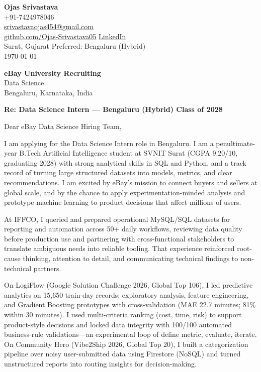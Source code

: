 \documentclass[a4paper,11pt]{article}
\begin{document}
\begin{flushright}
\textbf{Ojas Srivastava} \\
+91-7424978046 \\
\href{mailto:srivastavaojas454@gmail.com}{srivastavaojas454@gmail.com} \\
\href{https://github.com/Ojas-Srivastava05}{github.com/Ojas-Srivastava05} \textbar{}
\href{https://linkedin.com/in/ojas-srivastava05}{LinkedIn} \\
Surat, Gujarat \textbar{} Preferred: Bengaluru (Hybrid) \\
\today
\end{flushright}

\vspace{4mm}
\textbf{eBay University Recruiting} \\
Data Science \\
Bengaluru, Karnataka, India

\vspace{2mm}
\textbf{Re: Data Science Intern --- Bengaluru (Hybrid) \textbar{} Class of 2028}

Dear eBay Data Science Hiring Team,

I am applying for the Data Science Intern role in Bengaluru. I am a penultimate-year B.Tech Artificial Intelligence student at SVNIT Surat (CGPA 9.20/10, graduating 2028) with strong analytical skills in SQL and Python, and a track record of turning large structured datasets into models, metrics, and clear recommendations. I am excited by eBay's mission to connect buyers and sellers at global scale, and by the chance to apply experimentation-minded analysis and prototype machine learning to product decisions that affect millions of users.

At IFFCO, I queried and prepared operational MySQL/SQL datasets for reporting and automation across 50+ daily workflows, reviewing data quality before production use and partnering with cross-functional stakeholders to translate ambiguous needs into reliable tooling. That experience reinforced root-cause thinking, attention to detail, and communicating technical findings to non-technical partners.

On LogiFlow (Google Solution Challenge 2026, Global Top 106), I led predictive analytics on 15,650 train-day records: exploratory analysis, feature engineering, and Gradient Boosting prototypes with cross-validation (MAE 22.7 minutes; 81\% within 30 minutes). I used multi-criteria ranking (cost, time, risk) to support product-style decisions and locked data integrity with 100/100 automated business-rule validations---an experimental loop of define metric, evaluate, iterate. On Community Hero (Vibe2Ship 2026, Global Top 20), I built a categorization pipeline over noisy user-submitted data using Firestore (NoSQL) and turned unstructured reports into routing insights for decision-making.
\end{document}
